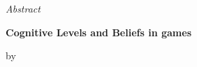 \documentclass[
12pt, %
spanish, %
onehalfspacing, %
headsepline, %
]{MastersDoctoralThesis} %
\begin{document}
\begin{abstract}
\end{abstract}



\cleardoublepage
\vspace*{0.11\textheight}
\begin{center}
	{\huge\textit{Abstract} \par}
	\bigskip
	\bigskip
	{\normalsize\bfseries Cognitive Levels and Beliefs in games \par} %
	\medskip
	{\normalsize by \authorname \par} %
	\bigskip
\end{center}
\end{document}
